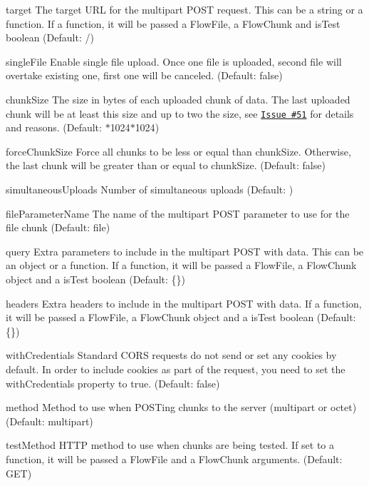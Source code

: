 \begin{DoxyItemize}
\item {\ttfamily target} The target U\+RL for the multipart P\+O\+ST request. This can be a string or a function. If a function, it will be passed a Flow\+File, a Flow\+Chunk and is\+Test boolean (Default\+: {\ttfamily /})
\item {\ttfamily single\+File} Enable single file upload. Once one file is uploaded, second file will overtake existing one, first one will be canceled. (Default\+: false)
\item {\ttfamily chunk\+Size} The size in bytes of each uploaded chunk of data. The last uploaded chunk will be at least this size and up to two the size, see \href{https://github.com/23/resumable.js/issues/51}{\tt Issue \#51} for details and reasons. (Default\+: {$\ast$1024$\ast$1024})
\item {\ttfamily force\+Chunk\+Size} Force all chunks to be less or equal than chunk\+Size. Otherwise, the last chunk will be greater than or equal to {\ttfamily chunk\+Size}. (Default\+: {\ttfamily false})
\item {\ttfamily simultaneous\+Uploads} Number of simultaneous uploads (Default\+: {})
\item {\ttfamily file\+Parameter\+Name} The name of the multipart P\+O\+ST parameter to use for the file chunk (Default\+: {\ttfamily file})
\item {\ttfamily query} Extra parameters to include in the multipart P\+O\+ST with data. This can be an object or a function. If a function, it will be passed a Flow\+File, a Flow\+Chunk object and a is\+Test boolean (Default\+: {\ttfamily \{\}})
\item {\ttfamily headers} Extra headers to include in the multipart P\+O\+ST with data. If a function, it will be passed a Flow\+File, a Flow\+Chunk object and a is\+Test boolean (Default\+: {\ttfamily \{\}})
\item {\ttfamily with\+Credentials} Standard C\+O\+RS requests do not send or set any cookies by default. In order to include cookies as part of the request, you need to set the {\ttfamily with\+Credentials} property to true. (Default\+: {\ttfamily false})
\item {\ttfamily method} Method to use when P\+O\+S\+Ting chunks to the server ({\ttfamily multipart} or {\ttfamily octet}) (Default\+: {\ttfamily multipart})
\item {\ttfamily test\+Method} H\+T\+TP method to use when chunks are being tested. If set to a function, it will be passed a Flow\+File and a Flow\+Chunk arguments. (Default\+: {\ttfamily G\+ET})

\end{DoxyItemize}
